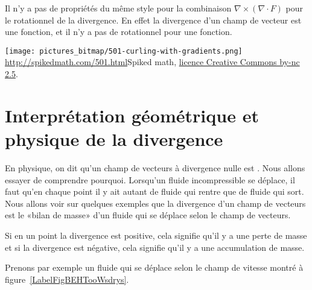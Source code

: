 \begin{remark}
    Il n'y a pas de propriétés du même style pour la combinaison $\nabla\times(\nabla\cdot F)$ pour le rotationnel de la divergence. En effet la divergence d'un champ de vecteur est une fonction, et il n'y a pas de rotationnel pour une fonction.
\end{remark}

{
\begin{center}
            \texttt{[image: pictures\_bitmap/501-curling-with-gradients.png]}\\
        \url{http://spikedmath.com/501.html}{Spiked math}, \href{http://creativecommons.org/licenses/by-nc-sa/2.5/ca/}{licence Creative Commons by-nc 2.5}.
\end{center}
}{}

\section[Interprétation de la divergence]{Interprétation géométrique et physique de la divergence}

En physique, on dit qu'un champ de vecteurs à divergence nulle est . Nous allons essayer de comprendre pourquoi. Lorsqu'un fluide incompressible se déplace, il faut qu'en chaque point il y ait autant de fluide qui rentre que de fluide qui sort. Nous allons voir sur quelques exemples que la divergence d'un champ de vecteurs est le «bilan de masse» d'un fluide qui se déplace selon le champ de vecteurs.

Si en un point la divergence est positive, cela signifie qu'il y a une perte de masse et si la divergence est négative, cela signifie qu'il y a une accumulation de masse.

Prenons par exemple un fluide qui se déplace selon le champ de vitesse montré à figure~\ref{LabelFigBEHTooWsdrys}. %
\newcommand{\CaptionFigBEHTooWsdrys}{Le champ de vecteurs $F(x,y)=\frac{1}{ x }(1,0)$.}


